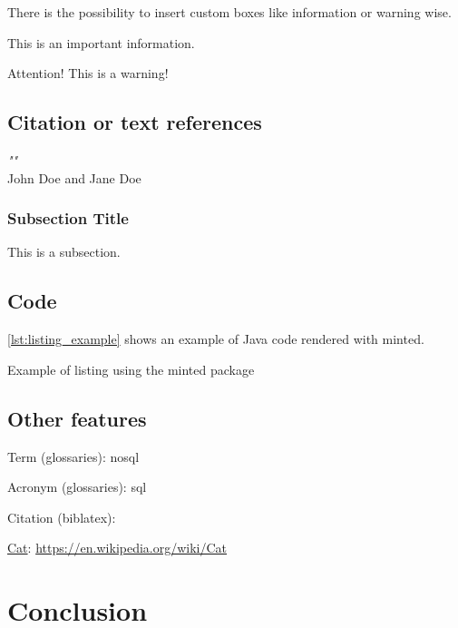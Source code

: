 There is the possibility to insert custom boxes like  information or warning wise.

\begin{info}
    This is an important information.
\end{info}

\begin{warning}
    Attention! This is a warning!
\end{warning}

\subsection{Citation or text references}
\begin{tcolorbox}[
        colback=white,
        colframe=languidlavender,
        sharp corners,
        title={\textit{Citation}},
        fonttitle=\bfseries\color{black}
    ]
    \textit{"\lipsum[1][1]"} \\[1ex]
    \hfill John Doe and Jane Doe
\end{tcolorbox}

\subsubsection{Subsection Title}

This is a subsection.

\subsection{Code}

\autoref{lst:listing_example} shows an example of Java code rendered with minted.

\begin{listing}[H]
    \caption{Example of listing using the minted package}
    \label{lst:listing_example}
\end{listing}

\subsection{Other features}

Term (glossaries): \gls{nosql}

Acronym (glossaries): \gls{sql}

Citation (biblatex): \cite{paper_millwheel}

\href{https://en.wikipedia.org/wiki/Cat}{Cat}:
\url{https://en.wikipedia.org/wiki/Cat}

\section{Conclusion}

\blindtext

